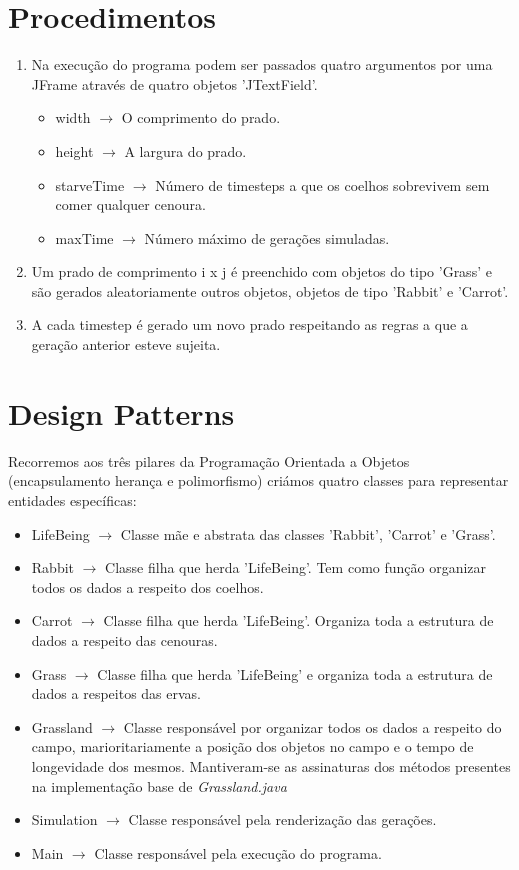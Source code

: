 \documentclass {report}
\begin{document}
\section{Procedimentos}
\begin{enumerate}
  \item Na execução do programa podem ser passados quatro argumentos por uma JFrame
				através de quatro objetos 'JTextField'.
		\begin{itemize}
			\item width \(\rightarrow\) O comprimento do prado.
			\item height \(\rightarrow\) A largura do prado. 
			\item starveTime \(\rightarrow\) Número de timesteps a que os coelhos 
					  sobrevivem sem comer qualquer cenoura. 
			\item maxTime \(\rightarrow\) Número máximo de gerações simuladas.
		\end{itemize}
	\item Um prado de comprimento i x j é preenchido com objetos do tipo 'Grass'
				e são gerados aleatoriamente outros objetos, objetos de tipo 'Rabbit' e 
				'Carrot'.
	\item A cada timestep é gerado um novo prado respeitando as regras a que
				a geração anterior esteve sujeita.
\end{enumerate}

\section{Design Patterns}
	Recorremos aos três pilares da Programação Orientada a Objetos (encapsulamento 
	herança e polimorfismo) criámos quatro classes para representar entidades
	específicas:
	\begin{itemize}
		\item	LifeBeing \(\rightarrow\) Classe mãe e abstrata das classes 'Rabbit',
					'Carrot' e 'Grass'.
		\item	Rabbit \(\rightarrow\) Classe filha que herda 'LifeBeing'. Tem como função 
					organizar todos os dados a respeito dos coelhos.
		\item	Carrot \(\rightarrow\) Classe filha que herda 'LifeBeing'. Organiza 
					toda a estrutura de dados a respeito das cenouras.
		\item	Grass \(\rightarrow\) Classe filha que herda 'LifeBeing' e organiza 
					toda a estrutura de dados a respeitos das ervas.
		\item Grassland \(\rightarrow\) Classe responsável por organizar todos os
					dados a respeito do campo, marioritariamente a posição dos objetos
					no campo e o tempo de longevidade dos mesmos. Mantiveram-se as 
					assinaturas dos métodos presentes na implementação base 
					de \textit{Grassland.java}
		\item Simulation \(\rightarrow\) Classe responsável
					pela renderização das gerações.
		\item Main \(\rightarrow\) Classe responsável pela execução do programa.
	\end{itemize}
\end{document}
